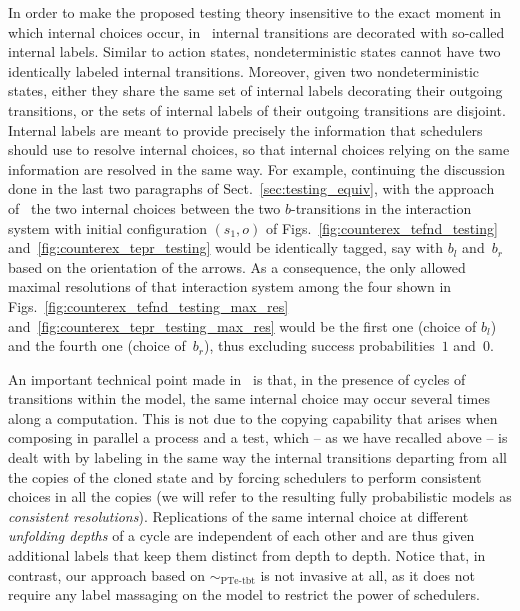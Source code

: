 \documentclass{LMCS}
\newcommand{\sbis}[1]
	{\sim_{#1}}
\begin{document}
In order to make the proposed testing theory insensitive to the exact moment in which internal choices
occur, in~\cite{GA12} internal transitions are decorated with so-called internal labels. Similar to action
states, nondeterministic states cannot have two identically labeled internal transitions. Moreover, given
two nondeterministic states, either they share the same set of internal labels decorating their outgoing
transitions, or the sets of internal labels of their outgoing transitions are disjoint. Internal labels are
meant to provide precisely the information that schedulers should use to resolve internal choices, so that
internal choices relying on the same information are resolved in the same way. For example, continuing the
discussion done in the last two paragraphs of Sect.~\ref{sec:testing_equiv}, with the approach
of~\cite{GA12} the two internal choices between the two $b$-transitions in the interaction system with
initial configuration $(s_{1}, o)$ of Figs.~\ref{fig:counterex_tefnd_testing}
and~\ref{fig:counterex_tepr_testing} would be identically tagged, say with $b_{l}$ and~$b_{r}$ based on the
orientation of the arrows. As a consequence, the only allowed maximal resolutions of that interaction system
among the four shown in Figs.~\ref{fig:counterex_tefnd_testing_max_res}
and~\ref{fig:counterex_tepr_testing_max_res} would be the first one (choice of $b_{l}$) and the fourth one
(choice of~$b_{r}$), thus excluding success probabilities~$1$ and~$0$.

An important technical point made in~\cite{GA12} is that, in the presence of cycles of transitions within
the model, the same internal choice may occur several times along a computation. This is not due to the
copying capability that arises when composing in parallel a process and a test, which -- as we have recalled
above -- is dealt with by labeling in the same way the internal transitions departing from all the copies of
the cloned state and by forcing schedulers to perform consistent choices in all the copies (we will refer to
the resulting fully probabilistic models as \emph{consistent resolutions}). Replications of the same
internal choice at different \emph{unfolding depths} of a cycle are independent of each other and are thus
given additional labels that keep them distinct from depth to depth. Notice that, in contrast, our approach
based on $\sbis{\textrm{PTe-tbt}}$ is not invasive at all, as it does not require any label massaging on the
model to restrict the power of schedulers.
\end{document}
